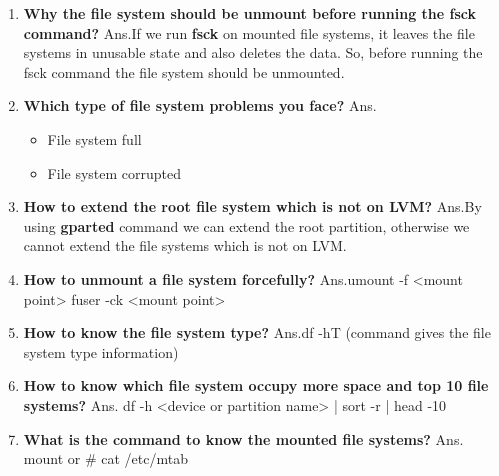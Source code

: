 \begin{enumerate}
\begin{enumerate}
  \bigskip
  \bigskip

  \item \textbf{Why the file system should be unmount before running the fsck command?}
  \newline
  Ans.If we run \textbf{fsck }on mounted file systems, it leaves the file systems in unusable state and also deletes the data. 	So, before running the fsck command the file system should be unmounted.
  

  \bigskip
  \bigskip

  \item \textbf{Which type of file system problems you face?}
  \newline
  Ans.\begin{itemize}
         \item File system full
         \item File system corrupted
      \end{itemize} 

  \bigskip
  \bigskip
    
  \item \textbf{How to extend the root file system which is not on LVM?}
  \newline
   Ans.By using \textbf{gparted }	command we can extend the root partition, otherwise we cannot extend the file systems 	which is not on LVM.

  \bigskip
  \bigskip

  \item \textbf{How to unmount a file system forcefully?}  
  \newline
  Ans.umount    -f    <mount point>
  \newline
	    fuser    -ck    <mount point>

  \bigskip
  \bigskip

  \item \textbf{How to know the file system type?}
  \newline
   Ans.df   -hT       (command gives the file system type information)

   \bigskip
   \bigskip

  \item \textbf{How to know which file system occupy more space and top 10 file systems?}
  \newline
  Ans. df   -h   <device or partition name>  | sort   -r  |  head    -10
  
  \bigskip
  \bigskip

  \item \textbf{What is the command to know the mounted file systems?}
  \newline
  Ans. mount    or  # cat  /etc/mtab


\end{enumerate}
\end{enumerate}
